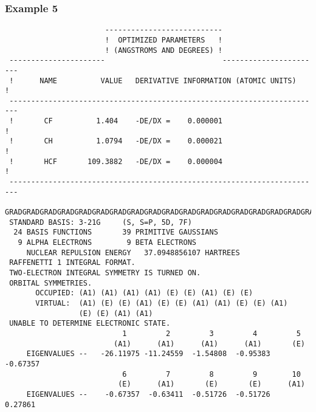 \subsubsection{\sf Example 5}
{\small
\begin{verbatim}
                       ---------------------------
                       !  OPTIMIZED PARAMETERS   !
                       ! (ANGSTROMS AND DEGREES) !
 ----------------------                           -----------------------
 !      NAME          VALUE   DERIVATIVE INFORMATION (ATOMIC UNITS)     !
 ------------------------------------------------------------------------
 !       CF          1.404    -DE/DX =    0.000001                      !
 !       CH          1.0794   -DE/DX =    0.000021                      !
 !       HCF       109.3882   -DE/DX =    0.000004                      !
 ------------------------------------------------------------------------
 GRADGRADGRADGRADGRADGRADGRADGRADGRADGRADGRADGRADGRADGRADGRADGRADGRADGRAD
 STANDARD BASIS: 3-21G     (S, S=P, 5D, 7F)
  24 BASIS FUNCTIONS       39 PRIMITIVE GAUSSIANS
   9 ALPHA ELECTRONS        9 BETA ELECTRONS
     NUCLEAR REPULSION ENERGY   37.0948856107 HARTREES
 RAFFENETTI 1 INTEGRAL FORMAT.
 TWO-ELECTRON INTEGRAL SYMMETRY IS TURNED ON.
 ORBITAL SYMMETRIES.
       OCCUPIED: (A1) (A1) (A1) (A1) (E) (E) (A1) (E) (E)
       VIRTUAL:  (A1) (E) (E) (A1) (E) (E) (A1) (A1) (E) (E) (A1)
                 (E) (E) (A1) (A1)
 UNABLE TO DETERMINE ELECTRONIC STATE.
                           1         2         3         4         5
                         (A1)      (A1)      (A1)      (A1)       (E)
     EIGENVALUES --   -26.11975 -11.24559  -1.54808  -0.95383  -0.67357
                           6         7         8         9        10
                          (E)      (A1)       (E)       (E)      (A1)
     EIGENVALUES --    -0.67357  -0.63411  -0.51726  -0.51726   0.27861
\end{verbatim}
}
\newpage
